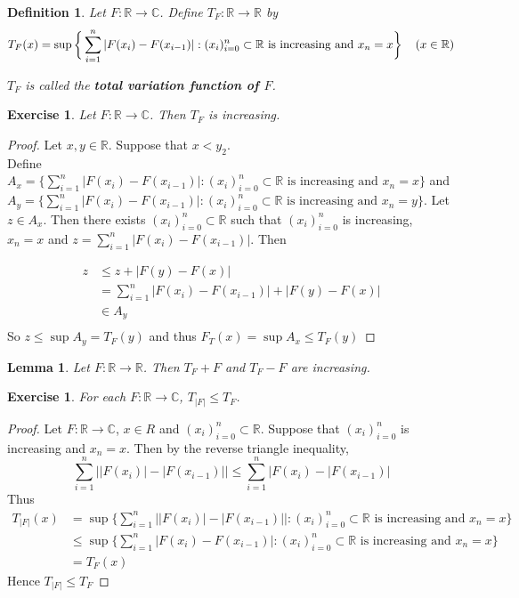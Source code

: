 \documentclass[12pt]{amsart}
\newtheorem{lem}[thm]{Lemma}
\newtheorem{defn}[thm]{Definition}
\newtheorem{ex}[thm]{Exercise}
\newcommand{\C}{\mathbb{C}}
\newcommand{\R}{\mathbb{R}}
\begin{document}
\begin{defn}
	Let $F:\R \rightarrow \C$. Define $T_F:\R \rightarrow \R$ by $$T_F(x) = \sup\bigg \{\sum_{i=1}^{n}|F(x_{i}) - F(x_{i-1})|: (x_i)_{i=0}^n \subset \R \text{ is increasing and } x_n=x  \bigg \} \hspace{4mm} (x \in \R)$$
	
	$T_F$ is called the \textbf{total variation function of $F$}.
\end{defn}

\begin{ex}
	Let $F:\R \rightarrow \C$. Then $T_F$ is increasing.
\end{ex}

\begin{proof}
	Let $x,y \in \R$. Suppose that $x<y_2$. \\Define  $A_x = \big \{\sum_{i=1}^{n}|F(x_{i}) - F(x_{i-1})|: (x_i)_{i=0}^n \subset \R \text{ is increasing and } x_n=x  \big \}$ and \\$A_y = \big \{\sum_{i=1}^{n}|F(x_{i}) - F(x_{i-1})|: (x_i)_{i=0}^n \subset \R \text{ is increasing and } x_n=y  \big \}$. Let $z \in A_x$. Then there exists $(x_i)_{i=0}^n \subset \R$ such that $(x_i)_{i=0}^n$ is increasing,\\ $x_n=x$ and $z = \sum_{i=1}^n |F(x_{i}) - F(x_{i-1})|$. Then
	
	\begin{align*}
		z 
		& \leq z+|F(y)-F(x)|\\
		&= \sum_{i=1}^n |F(x_{i}) - F(x_{i-1})| + |F(y)-F(x)|\\
		& \in A_y\\
	\end{align*} 
	So $z \leq \sup A_y = T_F(y) $ and thus $F_T(x)  = \sup A_x \leq T_F(y)$
\end{proof}

\begin{lem}
	Let $F:\R \rightarrow \R$. Then $T_F+F$ and $T_F-F$ are increasing.
\end{lem}

\begin{ex}
	For each $F:\R \rightarrow \C$, $T_{|F|} \leq T_F$.
\end{ex}

\begin{proof}
	Let $F:\R \rightarrow \C$, $x \in R$ and $(x_i)_{i=0}^n \subset \R$. Suppose that $(x_i)_{i=0}^n$ is increasing and $x_n=x$. Then by the reverse triangle inequality, $$ \sum_{i=1}^n\big||F(x_i)|-|F(x_{i-1})|\big|
	\leq \sum_{i=1}^n\big|F(x_i)-|F(x_{i-1})\big|$$
	Thus 
	\begin{align*}
		T_{|F|}(x) 
		&= \sup\bigg \{\sum_{i=1}^{n}\big||F(x_{i})| - |F(x_{i-1})|\big|: (x_i)_{i=0}^n \subset \R \text{ is increasing and } x_n=x  \bigg \} \\
		& \leq \sup\bigg \{\sum_{i=1}^{n}|F(x_{i}) - F(x_{i-1})|: (x_i)_{i=0}^n \subset \R \text{ is increasing and } x_n=x  \bigg \} \\
		&= T_F(x)
	\end{align*}
	Hence $T_{|F|} \leq T_F$
\end{proof}
\end{document}
